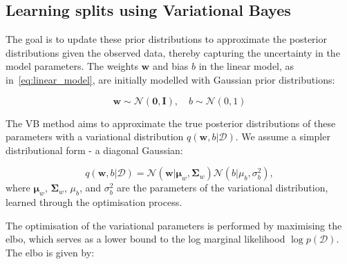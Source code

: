 \documentclass[3p,review,authoryear]{elsarticle}
\begin{document}

\subsection{Learning splits using Variational Bayes}


The goal is to update these prior distributions to approximate the posterior distributions given the observed data, thereby capturing the uncertainty in the model parameters.
The weights \(\mathbf{w}\) and bias \(b\) in the linear model, as in~\eqref{eq:linear_model}, are initially modelled with Gaussian prior distributions:

\begin{equation}
\mathbf{w} \sim \mathcal{N}(\mathbf{0}, \mathbf{I}), \quad b \sim \mathcal{N}(0, 1)
\end{equation}

The VB method aims to approximate the true posterior distributions of these parameters with a variational distribution \(q(\mathbf{w}, b|\mathcal{D})\).
We assume a simpler distributional form - a diagonal Gaussian:

\begin{equation}
q(\mathbf{w}, b|\mathcal{D}) = \mathcal{N}(\mathbf{w}|\boldsymbol{\mu}_w, \boldsymbol{\Sigma}_w) \mathcal{N}(b|\mu_b, \sigma_b^2),
\end{equation}
where \(\boldsymbol{\mu}_w\), \(\boldsymbol{\Sigma}_w\), \(\mu_b\), and \(\sigma_b^2\) are the parameters of the variational distribution, learned through the optimisation process.

The optimisation of the variational parameters is performed by maximising the \gls{elbo}, which serves as a lower bound to the log marginal likelihood \(\log p(\mathcal{D})\).
The \gls{elbo} is given by:
\end{document}
